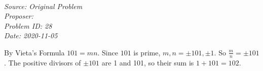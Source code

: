 \SSbreak\\
\emph{Source: Original Problem}\\
\emph{Proposer: \Pkiesh}\\
\emph{Problem ID: 28}\\
\emph{Date: 2020-11-05}\\
\SSbreak

\bigskip 

\begin{solution}\hfil\medskip 

    By Vieta's Formula $101 = mn$. Since $101$ is prime, $m, n = \pm 101, \pm 1$. So $\frac mn = \pm 101$. The positive divisors of $\pm 101$ are 1 and 101, so their sum is $1 + 101 = \boxed{102}$.
\end{solution}\bigskip

